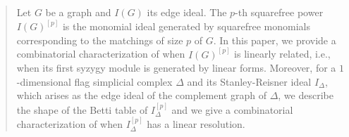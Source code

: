 \documentclass[12pt]{amsart}
\let\to=\rightarrow
\begin{document}
	
    
\maketitle
      
\begin{abstract}
Let $G$ be a graph and $I(G)$ its edge ideal. The $p$-th squarefree power $I(G)^{[p]}$ is the monomial ideal generated by squarefree monomials corresponding to the matchings of size $p$ of $G$. In this paper, we provide a combinatorial characterization of when $I(G)^{[p]}$ is linearly related, i.e., when its first syzygy module is generated by linear forms. Moreover, for a $1$-dimensional flag simplicial complex $\Delta$ and its Stanley-Reisner ideal $I_{\Delta}$, which arises as the edge ideal of the complement graph of $\Delta$, we describe the shape of the Betti table of $I_{\Delta}^{[p]}$ and we give a combinatorial characterization of when $I_{\Delta}^{[p]}$ has a linear resolution.
\end{abstract}
\end{document}
